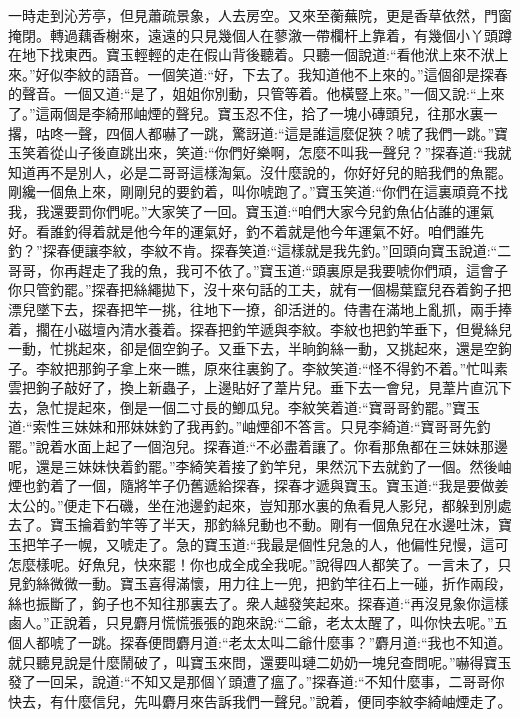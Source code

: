 \begin{parag}
    一時走到沁芳亭，但見蕭疏景象，人去房空。又來至蘅蕪院，更是香草依然，門窗掩閉。轉過藕香榭來，遠遠的只見幾個人在蓼漵一帶欄杆上靠着，有幾個小丫頭蹲在地下找東西。寶玉輕輕的走在假山背後聽着。只聽一個說道:“看他洑上來不洑上來。”好似李紋的語音。一個笑道:“好，下去了。我知道他不上來的。”這個卻是探春的聲音。一個又道:“是了，姐姐你別動，只管等着。他橫豎上來。”一個又說:“上來了。”這兩個是李綺邢岫煙的聲兒。寶玉忍不住，拾了一塊小磚頭兒，往那水裏一撂，咕咚一聲，四個人都嚇了一跳，驚訝道:“這是誰這麼促狹？唬了我們一跳。”寶玉笑着從山子後直跳出來，笑道:“你們好樂啊，怎麼不叫我一聲兒？”探春道:“我就知道再不是別人，必是二哥哥這樣淘氣。沒什麼說的，你好好兒的賠我們的魚罷。剛纔一個魚上來，剛剛兒的要釣着，叫你唬跑了。”寶玉笑道:“你們在這裏頑竟不找我，我還要罰你們呢。”大家笑了一回。寶玉道:“咱們大家今兒釣魚佔佔誰的運氣好。看誰釣得着就是他今年的運氣好，釣不着就是他今年運氣不好。咱們誰先釣？”探春便讓李紋，李紋不肯。探春笑道:“這樣就是我先釣。”回頭向寶玉說道:“二哥哥，你再趕走了我的魚，我可不依了。”寶玉道:“頭裏原是我要唬你們頑，這會子你只管釣罷。”探春把絲繩拋下，沒十來句話的工夫，就有一個楊葉竄兒吞着鉤子把漂兒墜下去，探春把竿一挑，往地下一撩，卻活迸的。侍書在滿地上亂抓，兩手捧着，擱在小磁壇內清水養着。探春把釣竿遞與李紋。李紋也把釣竿垂下，但覺絲兒一動，忙挑起來，卻是個空鉤子。又垂下去，半晌鉤絲一動，又挑起來，還是空鉤子。李紋把那鉤子拿上來一瞧，原來往裏鉤了。李紋笑道:“怪不得釣不着。”忙叫素雲把鉤子敲好了，換上新蟲子，上邊貼好了葦片兒。垂下去一會兒，見葦片直沉下去，急忙提起來，倒是一個二寸長的鯽瓜兒。李紋笑着道:“寶哥哥釣罷。”寶玉道:“索性三妹妹和邢妹妹釣了我再釣。”岫煙卻不答言。只見李綺道:“寶哥哥先釣罷。”說着水面上起了一個泡兒。探春道:“不必盡着讓了。你看那魚都在三妹妹那邊呢，還是三妹妹快着釣罷。”李綺笑着接了釣竿兒，果然沉下去就釣了一個。然後岫煙也釣着了一個，隨將竿子仍舊遞給探春，探春才遞與寶玉。寶玉道:“我是要做姜太公的。”便走下石磯，坐在池邊釣起來，豈知那水裏的魚看見人影兒，都躲到別處去了。寶玉掄着釣竿等了半天，那釣絲兒動也不動。剛有一個魚兒在水邊吐沫，寶玉把竿子一幌，又唬走了。急的寶玉道:“我最是個性兒急的人，他偏性兒慢，這可怎麼樣呢。好魚兒，快來罷！你也成全成全我呢。”說得四人都笑了。一言未了，只見釣絲微微一動。寶玉喜得滿懷，用力往上一兜，把釣竿往石上一碰，折作兩段，絲也振斷了，鉤子也不知往那裏去了。衆人越發笑起來。探春道:“再沒見象你這樣鹵人。”正說着，只見麝月慌慌張張的跑來說:“二爺，老太太醒了，叫你快去呢。”五個人都唬了一跳。探春便問麝月道:“老太太叫二爺什麼事？”麝月道:“我也不知道。就只聽見說是什麼鬧破了，叫寶玉來問，還要叫璉二奶奶一塊兒查問呢。”嚇得寶玉發了一回呆，說道:“不知又是那個丫頭遭了瘟了。”探春道:“不知什麼事，二哥哥你快去，有什麼信兒，先叫麝月來告訴我們一聲兒。”說着，便同李紋李綺岫煙走了。
\end{parag}


